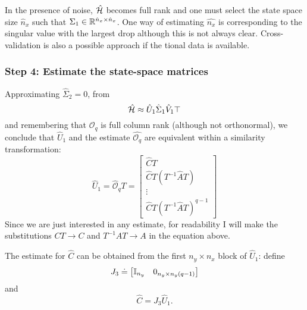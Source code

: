 In the presence of noise, $\hat{\mathcal{H}}$ becomes full rank and one must select the state space size $\hat{n}_x$ such that $\Sigma_1 \in \mathbb{R}^{\hat{n}_x\times \hat{n}_x}$. One way of estimating $\hat{n_x}$ is corresponding to the singular value with the largest drop although this is not always clear. Cross-validation is also a possible approach if the tional data is available.


\subsubsection{Step 4: Estimate the state-space matrices}

Approximating $\hat{\Sigma}_2=0$, from
\begin{equation*}
  \hat{\mathcal{H}} \approx \hat{U}_1\hat{\Sigma}_1\hat{V}_1\top
\end{equation*}
and remembering that $\mathcal{O}_q$ is full column rank (although not orthonormal), we conclude that $\hat{U}_1$ and the estimate $\hat{\mathcal{O}_q}$ are equivalent within a similarity transformation:
\begin{equation*}
  \hat{U}_1 = \hat{\mathcal{O}}_qT =
  \begin{bmatrix}
    \hat{C}T \\ \hat{C}T\left(T^{-1}\hat{A}T\right) \\ \vdots \\ \hat{C}T\left(T^{-1}\hat{A}T\right)^{q-1}
  \end{bmatrix}
\end{equation*}
Since we are just interested in any estimate, for readability I will make the substitutions $CT\rightarrow C$ and $T^{-1}AT \rightarrow A$ in the equation above.

The estimate for $\hat{C}$ can be obtained from the first $n_y\times n_x$ block of $\hat{U}_1$: define
\begin{equation*}
  J_3 \doteq
  \begin{bmatrix}
    \mathbb{I}_{n_y} & 0_{n_y\times n_y(q-1)}
  \end{bmatrix}
\end{equation*}
and
\begin{equation*}
  \hat{C} = J_3\hat{U}_1.
\end{equation*}

